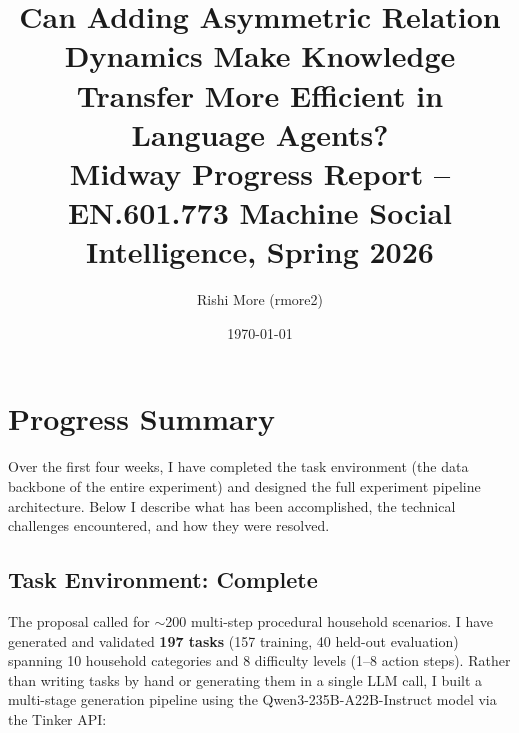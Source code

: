 \documentclass[11pt]{article}
\title{
    \vspace{-1.5cm}
    \textbf{Can Adding Asymmetric Relation Dynamics Make Knowledge Transfer More Efficient in Language Agents?} \\[0.4em]
    \large Midway Progress Report -- EN.601.773 Machine Social Intelligence, Spring 2026
}
\author{Rishi More (rmore2)}
\date{\today}
\begin{document}
\maketitle
\vspace{-0.5cm}
\vspace{0.4cm}

\section{Progress Summary}

Over the first four weeks, I have completed the task environment (the data backbone of the entire experiment) and designed the full experiment pipeline architecture. Below I describe what has been accomplished, the technical challenges encountered, and how they were resolved.

\subsection{Task Environment: Complete}

The proposal called for $\sim$200 multi-step procedural household scenarios. I have generated and validated \textbf{197 tasks} (157 training, 40 held-out evaluation) spanning 10 household categories and 8 difficulty levels (1--8 action steps). Rather than writing tasks by hand or generating them in a single LLM call, I built a multi-stage generation pipeline using the Qwen3-235B-A22B-Instruct model via the Tinker API:
\end{document}
